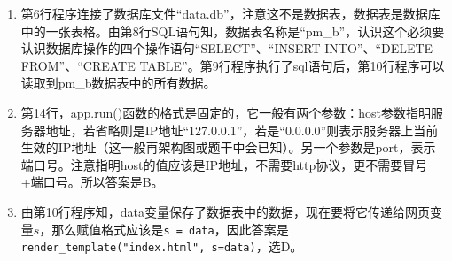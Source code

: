 \begin{enumerate}
\begin{enumerate}[label=$(\arabic*)$]
\begin{enumerate}[label=$(\alph*)$]
		\item 第6行程序连接了数据库文件“data.db”，注意这不是数据表，数据表是数据库中的一张表格。由第8行SQL语句知，数据表名称是“pm\_b”，认识这个必须要认识数据库操作的四个操作语句“SELECT”、“INSERT INTO”、“DELETE FROM”、“CREATE TABLE”。第9行程序执行了sql语句后，第10行程序可以读取到pm\_b数据表中的所有数据。
		\item 第14行，app.run()函数的格式是固定的，它一般有两个参数：host参数指明服务器地址，若省略则是IP地址“127.0.0.1”，若是“0.0.0.0”则表示服务器上当前生效的IP地址（这一般再架构图或题干中会已知）。另一个参数是port，表示端口号。注意指明host的值应该是IP地址，不需要http协议，更不需要冒号+端口号。所以答案是B。
		\item 由第10行程序知，data变量保存了数据表中的数据，现在要将它传递给网页变量$s$，那么赋值格式应该是\lstinline|s = data|，因此答案是\lstinline|render_template("index.html", s=data)|，选D。
		\end{enumerate}	
	\end{enumerate}


\end{enumerate}


\newpage
